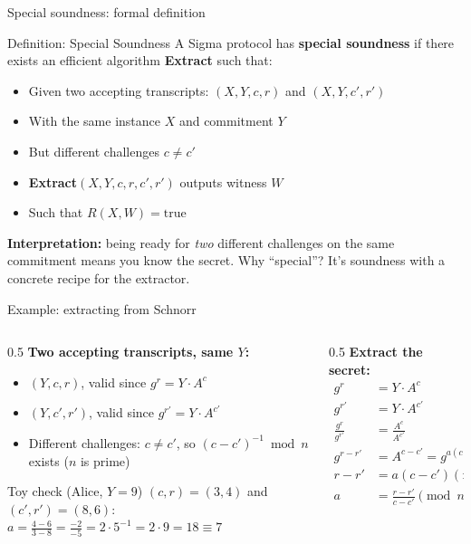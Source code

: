 \ifdefined\PRESENTATION\else\PassOptionsToClass{handout}{beamer}\fi\documentclass[aspectratio=169, lualatex]{beamer}
\begin{document}
\begin{frame}{Special soundness: formal definition}
	\begin{block}{Definition: Special Soundness}
		A Sigma protocol has \textbf{special soundness} if there exists an efficient algorithm \textbf{Extract} such that:
		\begin{itemize}
			\item Given two accepting transcripts: $(X, Y, c, r)$ and $(X, Y, c', r')$
			\item With the same instance $X$ and commitment $Y$
			\item But different challenges $c \neq c'$
			\item \textbf{Extract}$(X, Y, c, r, c', r')$ outputs witness $W$
			\item Such that $R(X, W) = \text{true}$
		\end{itemize}
	\end{block}
	\textbf{Interpretation:} being ready for \textit{two} different challenges on the same commitment means you know the secret. Why ``special''? It's soundness with a concrete recipe for the extractor.
\end{frame}

\begin{frame}{Example: extracting from Schnorr}
	\begin{columns}[c]
		\begin{column}{0.5\textwidth}
			\textbf{Two accepting transcripts, same $Y$:}
			\begin{itemize}
				\item $(Y, c, r)$, valid since $g^r = Y \cdot A^c$
				\item $(Y, c', r')$, valid since $g^{r'} = Y \cdot A^{c'}$
				\item Different challenges: $c \neq c'$, so $(c - c')^{-1} \bmod n$ exists ($n$ is prime)
			\end{itemize}
			\begin{exampleblock}{Toy check (Alice, $Y = 9$)}
				$(c, r) = (3, 4)$ and $(c', r') = (8, 6)$:\\
				$a = \frac{4 - 6}{3 - 8} = \frac{-2}{-5} = 2 \cdot 5^{-1} = 2 \cdot 9 = 18 \equiv 7$ \mycheckmark
			\end{exampleblock}
		\end{column}
		\begin{column}{0.5\textwidth}
			\textbf{Extract the secret:}
			\begin{align*}
				g^r                & = Y \cdot A^c                \\
				g^{r'}             & = Y \cdot A^{c'}             \\
				\frac{g^r}{g^{r'}} & = \frac{A^c}{A^{c'}}         \\
				g^{r-r'}           & = A^{c-c'} = g^{a(c-c')}     \\
				r-r'               & = a(c-c') \pmod{n}           \\
				a                  & = \frac{r-r'}{c-c'} \pmod{n}
			\end{align*}
		\end{column}
	\end{columns}
\end{frame}
\end{document}
